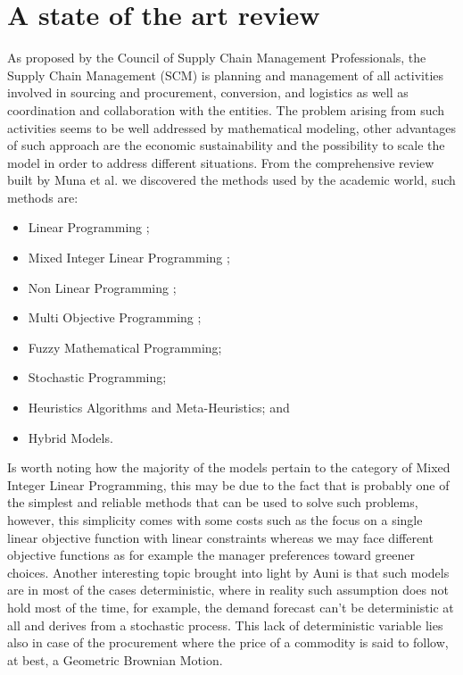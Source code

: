 \documentclass{article}
\begin{document}
\section{A state of the art review}
  As proposed by the Council of Supply Chain Management Professionals, the Supply Chain Management (SCM) is planning and management of all activities involved in sourcing and procurement, conversion, and logistics as well as coordination and collaboration with the entities. The problem arising from such activities seems to be well addressed by mathematical modeling, other advantages of such approach are the economic sustainability and the possibility to scale the model in order to address different situations.
  From the comprehensive review built by Muna et al. \cite{mula_mathematical_2010} we discovered the methods used by the academic world, such methods are:
  \begin{itemize}
    \item Linear Programming \cite{jung_order_2008};
    \item Mixed Integer Linear Programming \cite{romo_optimizing_2009};
    \item Non Linear Programming \cite{benjamin_analysis_1989};
    \item Multi Objective Programming \cite{torabi_interactive_2008};
    \item Fuzzy Mathematical Programming;
    \item Stochastic Programming;
    \item Heuristics Algorithms and Meta-Heuristics; and
    \item Hybrid Models.
  \end{itemize}

  Is worth noting how the majority of the models pertain to the category of Mixed Integer Linear Programming, this may be due to the fact that is probably one of the simplest and reliable methods that can be used to solve such problems, however, this simplicity comes with some costs such as the focus on a single linear objective function with linear constraints whereas we may face different objective functions as for example the manager preferences toward greener choices. Another interesting topic brought into light by Auni \cite{azimian_supply_2017} is that such models are in most of the cases deterministic, where in reality such assumption does not hold most of the time, for example, the demand forecast can't be deterministic at all and derives from a stochastic process. This lack of deterministic variable lies also in case of the procurement where the price of a commodity is said to follow, at best, a Geometric Brownian Motion.
\end{document}
